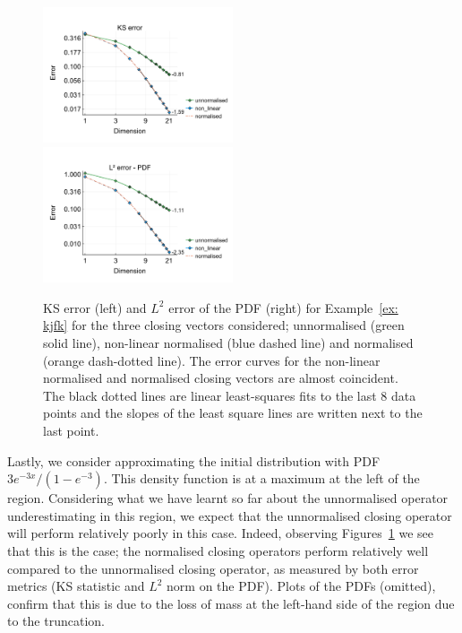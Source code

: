 \begin{example}\label{ex: kjfk}
	\begin{figure}[h]
		\centering
		\includegraphics[width=0.5\textwidth,trim={0.5cm 0.8cm 0.2cm 1.25cm},clip]{chapter6/figs/qbdrap_closing_vec/fun7/ks_error_formatted.pdf}%
		\includegraphics[width=0.5\textwidth,trim={0.5cm 0.8cm 0.2cm 1.25cm},clip]{chapter6/figs/qbdrap_closing_vec/fun7/l2_pdf_error_formatted.pdf}
		\caption{KS error (left) and \(L^2\) error of the PDF (right) for Example~\ref{ex: kjfk} for the three closing vectors considered; unnormalised (green solid line), non-linear normalised (blue dashed line) and normalised (orange dash-dotted line). The error curves for the non-linear normalised and normalised closing vectors are almost coincident. The black dotted lines are linear least-squares fits to the last 8 data points and the slopes of the least square lines are written next to the last point.}
		\label{fig: fun 7 ks error qbdrap closing vecs}
	\end{figure}
	Lastly, we consider approximating the initial distribution with PDF \(3e^{-3x}/(1-e^{-3})\). This density function is at a maximum at the left of the region. Considering what we have learnt so far about the unnormalised operator underestimating in this region, we expect that the unnormalised closing operator will perform relatively poorly in this case. Indeed, observing Figures~\ref{fig: fun 7 ks error qbdrap closing vecs} we see that this is the case; the normalised closing operators perform relatively well compared to the unnormalised closing operator, as measured by both error metrics (KS statistic and \(L^2\) norm on the PDF). Plots of the PDFs (omitted), confirm that this is due to the loss of mass at the left-hand side of the region due to the truncation. 
\end{example}

